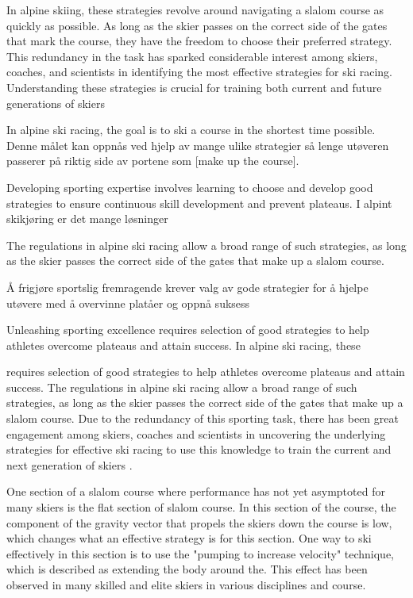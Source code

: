 \documentclass{article}
\begin{document}
In alpine skiing, these strategies revolve around navigating a slalom course as quickly as possible. As long as the skier passes on the correct side of the gates that mark the course, they have the freedom to choose their preferred strategy. This redundancy in the task has sparked considerable interest among skiers, coaches, and scientists in identifying the most effective strategies for ski racing. Understanding these strategies is crucial for training both current and future generations of skiers 



In alpine ski racing, the goal is to ski a course in the shortest time possible. Denne målet kan oppnås ved hjelp av mange ulike strategier så lenge utøveren passerer på riktig side av portene som [make up the course]. 




Developing sporting expertise involves learning to choose and develop good strategies to ensure continuous skill development and prevent plateaus. I alpint skikjøring er det mange løsninger 




The regulations in alpine ski racing allow a broad range of such strategies, as long as the skier passes the correct side of the gates that make up a slalom course. 


Å frigjøre sportslig fremragende krever valg av gode strategier for å hjelpe utøvere med å overvinne platåer og oppnå suksess 




Unleashing sporting excellence requires selection of good strategies to help athletes overcome plateaus and attain success. In alpine ski racing, these 


requires selection of good strategies to help athletes overcome plateaus and attain success. The regulations in alpine ski racing allow a broad range of such strategies, as long as the skier passes the correct side of the gates that make up a slalom course. Due to the redundancy of this sporting task, there has been great engagement among skiers, coaches and scientists in uncovering the underlying strategies for effective ski racing to use this knowledge to train the current and next generation of skiers \cite{joubertHowSkiNew1967, joubertSkiArtTechnique1978, mullerAnalysisBiomechanicalCharacteristics1994, lemasterSkierEdge1999, lemasterUltimateSkiing2010}.

One section of a slalom course where performance has not yet asymptoted for many skiers is the flat section of slalom course. In this section of the course, the component of the gravity vector that propels the skiers down the course is low, which changes what an effective strategy is for this section. One way to ski effectively in this section is to use the "pumping to increase velocity" technique, which is described as extending the body around the. This effect has been observed in many skilled and elite skiers in various disciplines and course.
\end{document}
